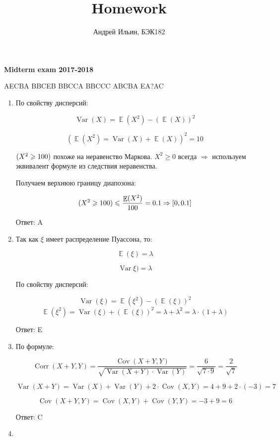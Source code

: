 \documentclass[a4paper]{article} %
\title{Homework}
\author{Андрей Ильин, БЭК182}
\DeclareMathOperator{\Var}{Var}
\DeclareMathOperator{\Cov}{Cov}
\DeclareMathOperator{\Corr}{Corr}
\DeclareMathOperator{\E}{\mathbb{E}}
\let\P\relax
\DeclareMathOperator{\P}{\mathbb{P}}
\renewcommand{\leq}{\leqslant}
\renewcommand{\geq}{\geqslant}
\begin{document}
\maketitle



\textbf{Midterm exam 2017-2018}

AECBA BBCEB BBCCA BBCCC ABCBA EA?AC

\begin{enumerate}

    \item

    По свойству дисперсий:

    \[ \Var(X) = \E(X^2) - (\E(X))^2 \]

    \[ (\E(X^2) = \Var(X) + \E(X))^2 = 10\]
    
    $\P(X^2 \geq 100)$ похоже на неравенство Маркова. $X^2 \geq 0$ всегда $\Rightarrow$ используем эквивалент формуле из следствия неравенства.
    
    Получаем верхнюю границу диапозона:

    \[\P(X^2 \geq 100) \leq \frac{\E(X^2)}{100} = 0.1  \Rightarrow [0, 0.1]\]

    Ответ: A

    \item

    Так как $\xi$ имеет распределение Пуассона, то:

    \[ \E(\xi) =\lambda \]

    \[ \Var\xi) =\lambda \]
    
    По свойству дисперсий:
    
    \[ \Var(\xi) = \E(\xi^2) - (\E(\xi))^2 \]
    \[ \E(\xi^2) = \Var(\xi) + (\E(\xi))^2 = \lambda + \lambda^2 = \lambda \cdot (1 + \lambda)\]

    Ответ: E

    \item
    
    По формуле:

    \[ \Corr(X+Y,Y) = \frac{\Cov(X+Y,Y)}{\sqrt{\Var(X+Y)\cdot \Var(Y)}} = \frac{6}{\sqrt{7\cdot 9}} = \frac{2}{\sqrt{7}} \]

    \[ \Var(X+Y) = \Var(X) + \Var(Y) + 2 \cdot \Cov(X,Y) = 4 + 9 + 2 \cdot (-3) = 7 \]

    \[\Cov(X+Y,Y) = \Cov(X,Y) + \Cov(Y,Y) = -3 + 9 = 6\]

    Ответ: C

    \item
    

\end{enumerate}
\end{document}
